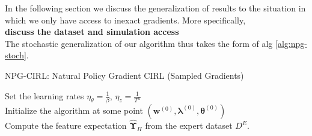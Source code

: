 In the following section we discuss the generalization of results to the situation in which we only have access to inexact gradients. More specifically, \\

\textbf{discuss the dataset and simulation access}\\

The stochastic generalization of our algorithm thus takes the form of alg \ref{alg:npg-stoch}.

\begin{algorithm}
    \SetAlgoLined
  \small
    \caption{NPG-CIRL: Natural Policy Gradient CIRL (Sampled Gradients)} 
    \label{alg:npg-stoch}
      Set the learning rates $\eta_\theta = \frac{1}{\beta}$, $\eta_z = \frac{1}{T^u}$ \\
      Initialize the algorithm at some point $(\bm{w}^{(0)},\bm{\lambda}^{(0)},\bm{\theta}^{(0)})$  \\
      Compute the feature expectation $\hat{\bm{\Upsilon}}_H$ from the expert dataset $D^E$.\\


\end{algorithm}
